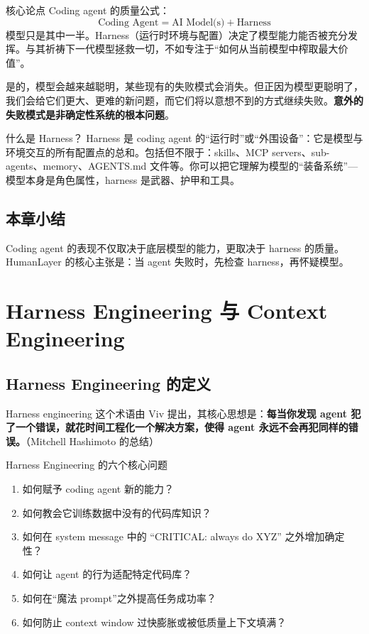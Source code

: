 \documentclass[a4paper]{article}
\begin{document}
\begin{importantbox}{核心论点}
Coding agent 的质量公式：
$$\text{Coding Agent} = \text{AI Model(s)} + \text{Harness}$$
模型只是其中一半。Harness（运行时环境与配置）决定了模型能力能否被充分发挥。与其祈祷下一代模型拯救一切，不如专注于``如何从当前模型中榨取最大价值''。
\end{importantbox}

是的，模型会越来越聪明，某些现有的失败模式会消失。但正因为模型更聪明了，我们会给它们更大、更难的新问题，而它们将以意想不到的方式继续失败。\textbf{意外的失败模式是非确定性系统的根本问题}。

\begin{knowledgebox}{什么是 Harness？}
Harness 是 coding agent 的``运行时''或``外围设备''：它是模型与环境交互的所有配置点的总和。包括但不限于：skills、MCP servers、sub-agents、memory、AGENTS.md 文件等。你可以把它理解为模型的``装备系统''---模型本身是角色属性，harness 是武器、护甲和工具。
\end{knowledgebox}

\subsection{本章小结}

Coding agent 的表现不仅取决于底层模型的能力，更取决于 harness 的质量。HumanLayer 的核心主张是：当 agent 失败时，先检查 harness，再怀疑模型。


\section{Harness Engineering 与 Context Engineering}

\subsection{Harness Engineering 的定义}

Harness engineering 这个术语由 Viv 提出，其核心思想是：\textbf{每当你发现 agent 犯了一个错误，就花时间工程化一个解决方案，使得 agent 永远不会再犯同样的错误。}（Mitchell Hashimoto 的总结）

\begin{importantbox}{Harness Engineering 的六个核心问题}
\begin{enumerate}[leftmargin=1.5em]
    \item 如何赋予 coding agent 新的能力？
    \item 如何教会它训练数据中没有的代码库知识？
    \item 如何在 system message 中的 ``CRITICAL: always do XYZ'' 之外增加确定性？
    \item 如何让 agent 的行为适配特定代码库？
    \item 如何在``魔法 prompt''之外提高任务成功率？
    \item 如何防止 context window 过快膨胀或被低质量上下文填满？
\end{enumerate}
\end{importantbox}
\end{document}

